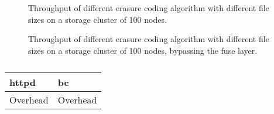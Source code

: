 \begin{figure}
    \centering
    
    \caption{Throughput of different erasure coding algorithm with different file sizes on a storage cluster of 100 nodes.}
    \label{fig:throughput-plot}
\end{figure}

\begin{figure}
    \centering
    
    \caption{Throughput of different erasure coding algorithm with different file sizes on a storage cluster of 100 nodes, bypassing the \acf{fuse} layer.}
    \label{fig:throughput-nofuse-plot}
\end{figure}

\begin{figure}
    \centering
    \caption{}
    \label{fig:latency-plot}
\end{figure}

\begin{table}
    \centering
    \begin{tabular}{ll}
        \toprule
        httpd & bc \\
        \midrule
        Overhead & Overhead \\
        \bottomrule
    \end{tabular}
    \caption{}
    \label{fig:overhead-table}
\end{table}

\begin{figure*}
    \centering
    \caption{}
    \label{fig:trace-experiment-plot}
\end{figure*}
